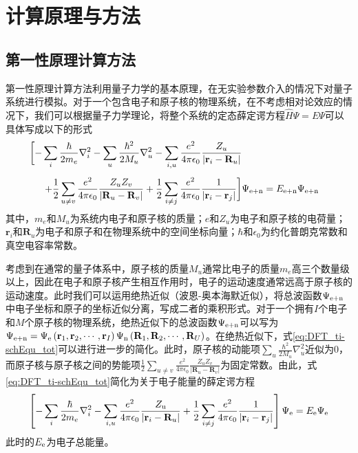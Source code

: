 \chapter{计算原理与方法}
\section{第一性原理计算方法}
第一性原理计算方法利用量子力学的基本原理，在无实验参数介入的情况下对量子系统进行模拟。对于一个包含电子和原子核的物理系统，在不考虑相对论效应的情况下，我们可以根据量子力学理论，将整个系统的定态薛定谔方程$\hat{H}\Psi =E\Psi$可以具体写成以下的形式\chinesecolon
\begin{equation}
    \label{eq:DFT_ti-schEqu_tot}
    \begin{split}
        \biggl[-\sum_{i} \frac{\hbar}{2m_e}\nabla_i^2-\sum_{u} \frac{\hbar^2}{2M_u}\nabla_u^2-\sum_{i,u}\frac{e^2}{4\pi\epsilon_0}\frac{Z_u}{\left\lvert {\mathbf r}_i - {\mathbf R}_u \right\rvert } \biggr. \\[+1ex]
        \biggl.+\frac{1}{2} \sum_{u\neq v}\frac{e^2}{4\pi\epsilon_0}\frac{Z_uZ_v}{\left\lvert {\mathbf R}_u-{\mathbf R}_v\right\rvert} + \frac{1}{2}\sum_{i\neq j}\frac{e^2}{4\pi\epsilon_0} \frac{1}{\left\lvert {\mathbf r}_i - {\mathbf r}_j \right\rvert} \biggr]&\Psi_{\rm e+n}=E_{\rm e+n}\Psi_{\rm e+n}
    \end{split}
\end{equation}
其中，$m_e$和$M_u$为系统内电子和原子核的质量；$e$和$Z_u$为电子和原子核的电荷量；${\bm r}_i$和${\bm R}_u$为电子和原子和在物理系统中的空间坐标向量；$\hbar$和$\epsilon_0$为约化普朗克常数和真空电容率常数。

考虑到在通常的量子体系中，原子核的质量$M_u$通常比电子的质量$m_e$高三个数量级以上，因此在电子和原子核产生相互作用时，电子的运动速度通常远高于原子核的运动速度。此时我们可以运用绝热近似（波恩-奥本海默近似），将总波函数$\Psi_{\rm e+n}$中电子坐标和原子的坐标近似分离，写成二者的乘积形式。对于一个拥有$I$个电子和$M$个原子核的物理系统，绝热近似下的总波函数$\Psi_{\rm e+n}$可以写为\chinesecolon $\Psi_{\rm e+n}=\Psi_{\rm e}\left({\mathbf r}_1,{\mathbf r}_2,\cdots,{\mathbf r}_I\right)\Psi_{\rm n}\left({\mathbf R}_1,{\mathbf R}_2,\cdots,{\mathbf R}_U\right)$。在绝热近似下，式\ref{eq:DFT_ti-schEqu_tot}可以进行进一步的简化。此时，原子核的动能项$\sum_{u} \frac{\hbar^2}{2M_u}\nabla_u^2$近似为0，而原子核与原子核之间的势能项$ \frac{1}{2} \sum_{u\neq v}\frac{e^2}{4\pi\epsilon_0}\frac{Z_uZ_v}{\left\lvert {\bm R}_u-{\bm R}_v\right\rvert}$为固定常数。由此，式\ref{eq:DFT_ti-schEqu_tot}简化为关于电子能量的薛定谔方程\chinesecolon
\begin{equation}
    \label{eq:DFT_schEqu_e}
    \left[-\sum_{i}\frac{\hbar}{2m_e}\nabla_i^2 -\sum_{i,u}\frac{e^2}{4\pi\epsilon_0}\frac{Z_{\rm u}}{\left\lvert{\mathbf r}_i - {\mathbf R}_u\right\rvert} + \frac{1}{2}\sum_{i\neq j}\frac{e^2}{4\pi\epsilon_0} \frac{1}{\left\lvert {\mathbf r}_i - {\mathbf r}_j \right\rvert} \right]\Psi_{\rm e}=E_{\rm e}\Psi_{\rm e}
\end{equation}
此时的$E_{\rm e}$为电子总能量。

